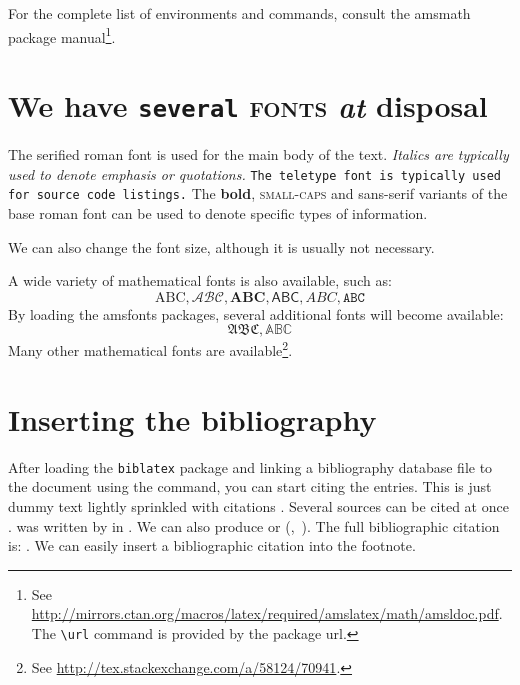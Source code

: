 \documentclass[
  digital, %
  table,   %
  lof,     %
  lot,     %
]{fithesis3}
\begin{document}
For the complete list of environments and commands, consult the
\textsf{amsmath} package manual\footnote{
  See \url{http://mirrors.ctan.org/macros/latex/required/amslatex/math/amsldoc.pdf}.
  The \texttt{\textbackslash url} command is provided by the
  package \textsf{url}.
}.

\chapter{\textnormal{We \textsf{have} \texttt{several} \textsc{fonts}
  \textit{at} \textbf{disposal}}}
The serified roman font is used for the main body of the text.
\textit{Italics are typically used to denote emphasis or
quotations.} \texttt{The teletype font is typically used for source
code listings.} The \textbf{bold}, \textsc{small-caps} and
\textsf{sans-serif} variants of the base roman font can be used to
denote specific types of information.

\tiny We \scriptsize can \footnotesize also \small change \normalsize
the \large font \Large size, \LARGE although \huge it \Huge
is \huge usually \LARGE not \Large necessary.\normalsize

A wide variety of mathematical fonts is also available, such as: \[
  \mathrm{ABC}, \mathcal{ABC}, \mathbf{ABC}, \mathsf{ABC},
  \mathit{ABC}, \mathtt{ABC}
\] By loading the \textsf{amsfonts} packages, several additional
fonts will become available: \[
  \mathfrak{ABC}, \mathbb{ABC}
\] Many other mathematical fonts are available\footnote{
  See \url{http://tex.stackexchange.com/a/58124/70941}.
}.

\chapter{Inserting the bibliography}
After loading the \texttt{biblatex} package and linking a
bibliography data\-base file to the document using the
\verb"" command, you can start citing the entries.
This is just dummy text \cite{inbook-full} lightly sprinkled with
citations \cite[p.~123]{incollection-full}.  Several sources can be
cited at once \cite{whole-collection, manual-minimal,manual-full}.
 was written by \citeauthor{inbook-full} in
\citeyear{inbook-full}. We can also produce \textcite{inbook-full}
or%
\def\citeauthoryear#1{(\textcite{#1},~\citeyear{#1})}
\citeauthoryear{inbook-full}. The full bibliographic citation is:
\emph{}. We can easily insert a bibliographic
citation into the footnote.
\end{document}
